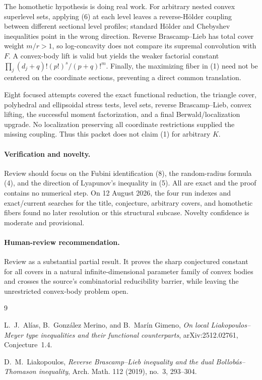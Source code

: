\documentclass[11pt]{article}
\begin{document}
The homothetic hypothesis is doing real work.  For arbitrary nested convex
superlevel sets, applying (6) at each level leaves a reverse-H\"older coupling
between different sectional level profiles; standard H\"older and Chebyshev
inequalities point in the wrong direction.  Reverse Brascamp--Lieb has total
cover weight \(m/r>1\), so log-concavity does not compare its supremal
convolution with \(F\).  A convex-body lift is valid but yields the weaker
factorial constant
\(\prod_j(d_j+q)!(p!)^s/(p+q)!^m\).  Finally, the maximizing fiber in (1)
need not be centered on the coordinate sections, preventing a direct common
translation.

Eight focused attempts covered the exact functional reduction, the triangle
cover, polyhedral and ellipsoidal stress tests, level sets, reverse
Brascamp--Lieb, convex lifting, the successful moment factorization, and a
final Berwald/localization upgrade.  No localization preserving all
coordinate restrictions supplied the missing coupling.  Thus this packet
does not claim (1) for arbitrary \(K\).

\paragraph{Verification and novelty.}
Review should focus on the Fubini identification (8), the random-radius
formula (4), and the direction of Lyapunov's inequality in (5).  All are exact
and the proof contains no numerical step.  On 12 August 2026, the four run
indexes and exact/current searches for the title, conjecture, arbitrary
covers, and homothetic fibers found no later resolution or this structural
subcase.  Novelty confidence is moderate and provisional.

\paragraph{Human-review recommendation.}
Review as a substantial partial result.  It proves the sharp conjectured
constant for all covers in a natural infinite-dimensional parameter family
of convex bodies and crosses the source's combinatorial reducibility barrier,
while leaving the unrestricted convex-body problem open.

\begin{thebibliography}{9}

L.~J.~Al\'ias, B.~Gonz\'alez Merino, and B.~Mar\'in Gimeno,
\emph{On local Liakopoulos--Meyer type inequalities and their functional
counterparts}, arXiv:2512.02761, Conjecture~1.4.

D.~M.~Liakopoulos,
\emph{Reverse Brascamp--Lieb inequality and the dual Bollob\'as--Thomason
inequality}, Arch. Math. 112 (2019), no.~3, 293--304.

\end{thebibliography}
\end{document}
